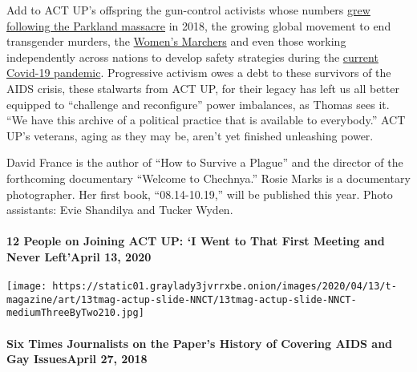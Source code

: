 Add to ACT UP's offspring the gun-control activists whose numbers
\href{https://www.nytimes3xbfgragh.onion/2019/02/13/us/parkland-shooting.html}{grew
following the Parkland massacre} in 2018, the growing global movement to
end transgender murders, the
\href{https://www.nytimes3xbfgragh.onion/2017/01/21/us/womens-march.html}{Women's
Marchers} and even those working independently across nations to develop
safety strategies during the
\href{https://www.nytimes3xbfgragh.onion/news-event/coronavirus}{current
Covid-19 pandemic}. Progressive activism owes a debt to these survivors
of the AIDS crisis, these stalwarts from ACT UP, for their legacy has
left us all better equipped to ``challenge and reconfigure'' power
imbalances, as Thomas sees it. ``We have this archive of a political
practice that is available to everybody.'' ACT UP's veterans, aging as
they may be, aren't yet finished unleashing power.

David France is the author of ``How to Survive a Plague'' and the
director of the forthcoming documentary ``Welcome to Chechnya.'' Rosie
Marks is a documentary photographer. Her first book, ``08.14-10.19,''
will be published this year. Photo assistants: Evie Shandilya and Tucker
Wyden.

\href{https://www.nytimes3xbfgragh.onion/2020/04/13/t-magazine/act-up-members.html}{}

\hypertarget{12-people-on-joining-act-up-i-went-to-that-first-meeting-and-never-leftapril-13-2020}{%
\paragraph{12 People on Joining ACT UP: `I Went to That First Meeting
and Never Left'April 13,
2020}\label{12-people-on-joining-act-up-i-went-to-that-first-meeting-and-never-leftapril-13-2020}}

\texttt{[image: https://static01.graylady3jvrrxbe.onion/images/2020/04/13/t-magazine/art/13tmag-actup-slide-NNCT/13tmag-actup-slide-NNCT-mediumThreeByTwo210.jpg]}
\href{https://www.nytimes3xbfgragh.onion/2018/04/27/t-magazine/times-journalists-aids-gay-history.html}{}

\hypertarget{six-times-journalists-on-the-papers-history-of-covering-aids-and-gay-issuesapril-27-2018}{%
\paragraph{Six Times Journalists on the Paper's History of Covering AIDS
and Gay IssuesApril 27,
2018}\label{six-times-journalists-on-the-papers-history-of-covering-aids-and-gay-issuesapril-27-2018}}

